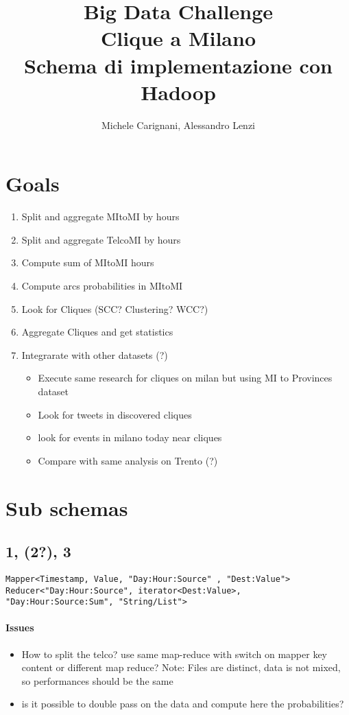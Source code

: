 \documentclass[10pt,a4paper]{article}
\author{Michele Carignani, Alessandro Lenzi}
\title{Big Data Challenge\\Clique a Milano\\Schema di implementazione con Hadoop}
\begin{document}
\maketitle

\section{Goals}
\begin{enumerate}
 \item Split and aggregate MItoMI by hours
 \item Split and aggregate TelcoMI by hours
 \item Compute sum of MItoMI hours
 \item Compute arcs probabilities in MItoMI
 \item Look for Cliques (SCC? Clustering? WCC?)
 \item Aggregate Cliques and get statistics 
 \item Integrarate with other datasets (?)
 	\begin{itemize}
 		\item Execute same research for cliques on milan but using MI to Provinces dataset
 		\item Look for tweets in discovered cliques
 		\item look for events in milano today near cliques
		\item Compare with same analysis on Trento (?)
	\end{itemize}
\end{enumerate}

\section{Sub schemas}

\subsection{1, (2?), 3}

\begin{verbatim}
Mapper<Timestamp, Value, "Day:Hour:Source" , "Dest:Value">
Reducer<"Day:Hour:Source", iterator<Dest:Value>, "Day:Hour:Source:Sum", "String/List"> 
\end{verbatim}

\paragraph{Issues}
\begin{itemize}
 \item How to split the telco? use same map-reduce with switch on mapper key content or different map
 reduce? Note: Files are distinct, data is not mixed, so performances should be the same
 \item is it possible to double pass on the data and compute here the probabilities?
\end{itemize}
\end{document}
